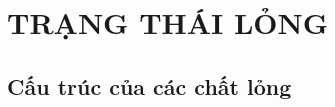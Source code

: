 

\chapter{TRẠNG THÁI LỎNG}\label{chap:14}


\section{Cấu trúc của các chất lỏng}\label{sec:14_1}


